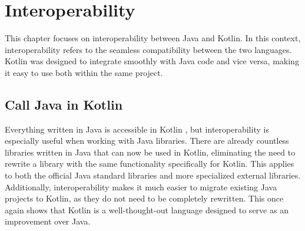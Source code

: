 \documentclass[a4paper,11pt]{article}
\begin{document}
\section{Interoperability}

This chapter focuses on interoperability between Java and Kotlin. In this context, interoperability refers to the seamless compatibility between the two languages. Kotlin was designed to integrate smoothly with Java code and vice versa, making it easy to use both within the same project.

\subsection{Call Java in Kotlin}
Everything written in Java is accessible in Kotlin \cite{interop}, but interoperability is especially useful when working with Java libraries. There are already countless libraries written in Java that can now be used in Kotlin, eliminating the need to rewrite a library with the same functionality specifically for Kotlin. This applies to both the official Java standard libraries and more specialized external libraries. Additionally, interoperability makes it much easier to migrate existing Java projects to Kotlin, as they do not need to be completely rewritten. This once again shows that Kotlin is a well-thought-out language designed to serve as an improvement over Java.
\end{document}
